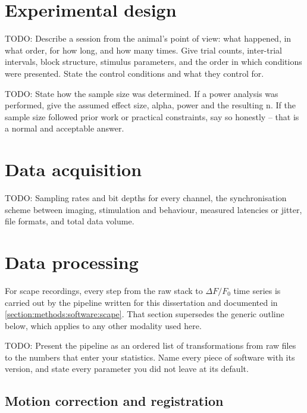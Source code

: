 	\section{Experimental design}\label{section:methods:design}

		TODO: Describe a session from the animal's point of view: what
		happened, in what order, for how long, and how many times. Give trial
		counts, inter-trial intervals, block structure, stimulus parameters,
		and the order in which conditions were presented. State the control
		conditions and what they control for.

		TODO: State how the sample size was determined. If a power analysis was
		performed, give the assumed effect size, alpha, power and the resulting
		n. If the sample size followed prior work or practical constraints, say
		so honestly -- that is a normal and acceptable answer.

	\section{Data acquisition}\label{section:methods:acquisition}

		TODO: Sampling rates and bit depths for every channel, the
		synchronisation scheme between imaging, stimulation and behaviour,
		measured latencies or jitter, file formats, and total data volume.

	\section{Data processing}\label{section:methods:processing}

		For \acrshort{scape} recordings, every step from the raw stack to
		$\Delta F/F_0$ time series is carried out by the \mavca{} pipeline
		written for this dissertation and documented in
		\cref{section:methods:software:scape}. That section supersedes the
		generic outline below, which applies to any other modality used here.

		TODO: Present the pipeline as an ordered list of transformations from
		raw files to the numbers that enter your statistics. Name every piece
		of software with its version, and state every parameter you did not
		leave at its default.

		\subsection{Motion correction and registration}

